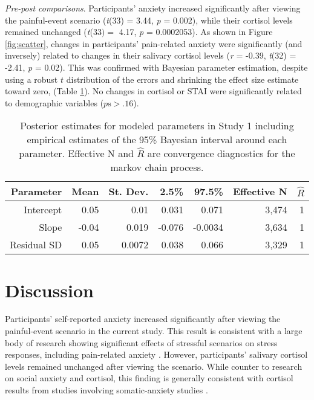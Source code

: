 \documentclass[review]{elsarticle}\usepackage[]{graphicx}\usepackage[]{color}
\begin{document}
\emph{Pre-post comparisons}. Participants' anxiety increased significantly after viewing the painful-event scenario (\textit{t}(33) = 3.44, \textit{p} = 0.002), while their cortisol levels remained unchanged (\textit{t}(33$) = $ 4.17, \textit{p} = 0.0002053).
As shown in Figure \ref{fig:scatter}, changes in participants' pain-related anxiety were significantly (and inversely) related to changes in their salivary cortisol levels (\textit{r} = -0.39, \textit{t}(32) = -2.41, \textit{p} = 0.02).
This was confirmed with Bayesian parameter estimation, despite using a robust $t$ distribution of the errors and shrinking the effect size estimate toward zero, (Table \ref{tab:bayes1}).
No changes in cortisol or STAI were significantly related to demographic variables ($p \mbox{s} > .16$).

\begin{table}[ht]
\centering
  \caption{Posterior estimates for modeled parameters in Study 1 including empirical estimates of the 95\% Bayesian interval around each parameter. Effective N and $\hat{R}$ are convergence diagnostics for the markov chain process.}
  \begin{tabular}{rrrrrrr}
  \hline
  Parameter & Mean & St. Dev. & 2.5\% & 97.5\% & Effective N & $\hat{R}$ \\
  \hline
Intercept & 0.05 & 0.01 & 0.031 & 0.071 & 3,474 &   1 \\ 
  Slope & -0.04 & 0.019 & -0.076 & -0.0034 & 3,634 &   1 \\ 
  Residual SD & 0.05 & 0.0072 & 0.038 & 0.066 & 3,329 &   1 \\ 
   \hline

  \end{tabular}
  \label{tab:bayes1}
\end{table}

\section*{Discussion}
\label{sec:discussion1}

Participants' self-reported anxiety increased significantly after viewing the painful-event scenario in the current study.
This result is consistent with a large body of research showing significant effects of stressful scenarios on stress responses, including pain-related anxiety \cite{chung2005pain,moore2009information}.
However, participants' salivary cortisol levels remained unchanged after viewing the scenario.
While counter to research on social anxiety and cortisol, this finding is generally consistent with cortisol results from studies involving somatic-anxiety studies \cite{turner2010sex,noto2005relationship}.
\end{document}

